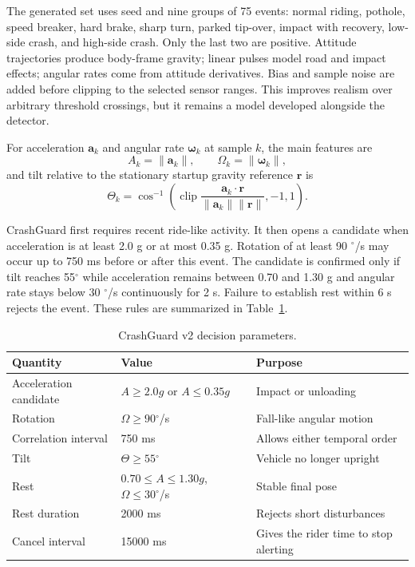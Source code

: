 \documentclass[12pt,a4paper]{article}
\newcommand{\degree}{\ensuremath{^{\circ}}}
\begin{document}
The generated set uses seed \SimulationSeed{} and nine groups of 75 events:
normal riding, pothole, speed breaker, hard brake, sharp turn, parked
tip-over, impact with recovery, low-side crash, and high-side crash. Only the
last two are positive. Attitude trajectories produce body-frame gravity;
linear pulses model road and impact effects; angular rates come from attitude
derivatives. Bias and sample noise are added before clipping to the selected
sensor ranges. This improves realism over arbitrary threshold crossings, but
it remains a model developed alongside the detector.

For acceleration $\mathbf a_k$ and angular rate $\boldsymbol\omega_k$ at
sample $k$, the main features are
\begin{equation}
 A_k=\|\mathbf a_k\|,\qquad
 \Omega_k=\|\boldsymbol\omega_k\|,
\end{equation}
and tilt relative to the stationary startup gravity reference $\mathbf r$ is
\begin{equation}
 \Theta_k=\cos^{-1}\!\left(
 \operatorname{clip}\frac{\mathbf a_k\cdot\mathbf r}
 {\|\mathbf a_k\|\|\mathbf r\|},-1,1\right).
\end{equation}

CrashGuard first requires recent ride-like activity. It then opens a
candidate when acceleration is at least 2.0 g or at most 0.35 g. Rotation of
at least 90 $\degree$/s may occur up to 750 ms before or after this event.
The candidate is confirmed only if tilt reaches 55$\degree$ while acceleration
remains between 0.70 and 1.30 g and angular rate stays below 30 $\degree$/s
continuously for 2 s. Failure to establish rest within 6 s rejects the event.
These rules are summarized in Table~\ref{tab:parameters}.

\begin{table}[H]
\centering
\small
\caption{CrashGuard v2 decision parameters.}
\label{tab:parameters}
\begin{tabular}{@{}lll@{}}
\toprule
Quantity & Value & Purpose \\
\midrule
Acceleration candidate & $A\geq2.0g$ or $A\leq0.35g$ & Impact or unloading \\
Rotation & $\Omega\geq90\degree$/s & Fall-like angular motion \\
Correlation interval & 750 ms & Allows either temporal order \\
Tilt & $\Theta\geq55\degree$ & Vehicle no longer upright \\
Rest & $0.70\leq A\leq1.30g$, $\Omega\leq30\degree$/s & Stable final pose \\
Rest duration & 2000 ms & Rejects short disturbances \\
Cancel interval & 15000 ms & Gives the rider time to stop alerting \\
\bottomrule
\end{tabular}
\end{table}
\end{document}
